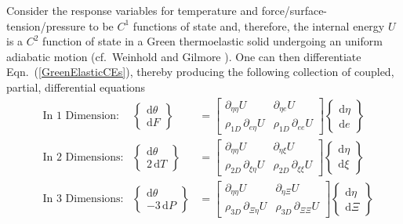 Consider the response variables for temperature and force\slash surface-tension\slash pressure to be $C^1$ functions of state and, therefore, the internal energy $U$ is a $C^2$ function of state in a Green thermo\-elastic solid undergoing an uniform adiabatic motion (cf.\ Weinhold \cite{Weinhold75c} and Gilmore \cite{Gilmore84}).  One can then differentiate Eqn.~(\ref{GreenElasticCEs}), thereby producing the following collection of coupled, partial, differential equations
\begin{subequations}
    \label{GreenElasticODEs}
    \begin{align}
    \mbox{} & \text{In 1 Dimension:} &
    \left\{ \begin{matrix} \mathrm{d} \theta \\ 
    \mathrm{d} F \end{matrix} \right\} & = \begin{bmatrix}
    \partial_{\eta\eta} U & \partial_{\eta e} U \\
    \rho_{1D} \, \partial_{e\eta} U & \rho_{1D} \, \partial_{ee} U \end{bmatrix} 
    \left\{ \begin{matrix} \mathrm{d} \eta \\
    \mathrm{d} e \end{matrix} \right\} \\
    \mbox{} & \text{In 2 Dimensions:} &
    \left\{ \begin{matrix} \mathrm{d} \theta \\ 
    2 \, \mathrm{d} T \end{matrix} \right\} & = \begin{bmatrix}
    \partial_{\eta\eta} U & \partial_{\eta \xi} U \\
    \rho_{2D} \, \partial_{\xi\eta} U & \rho_{2D} \, \partial_{\xi\xi} U \end{bmatrix} \left\{ \begin{matrix} \mathrm{d} \eta \\
    \mathrm{d} \xi \end{matrix} \right\} \label{GreenMembrane} \\
    \mbox{} & \text{In 3 Dimensions:} &
    \left\{ \begin{matrix} \mathrm{d} \theta \\ 
    -3 \, \mathrm{d} P \end{matrix} \right\} & = \begin{bmatrix}
    \partial_{\eta\eta} U & \partial_{\eta \Xi} U \\
    \rho_{3D} \, \partial_{\Xi\eta} U & \rho_{3D} \, \partial_{\Xi\Xi} U \end{bmatrix} \left\{ \begin{matrix} \mathrm{d} \eta \\
    \mathrm{d} \Xi \end{matrix} \right\} \label{GreenSolid}
    \end{align}
\end{subequations}
